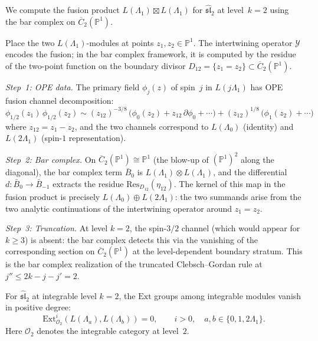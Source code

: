 \begin{example}
\label{ex:fusion-bar-sl2}
We compute the fusion product $L(\Lambda_1) \boxtimes L(\Lambda_1)$
for $\widehat{\mathfrak{sl}}_2$ at level~$k=2$ using the bar
complex on $\overline{C}_2(\mathbb{P}^1)$.

Place the two $L(\Lambda_1)$-modules at points $z_1, z_2 \in
\mathbb{P}^1$. The intertwining operator $\mathcal{Y}$ encodes
the fusion; in the bar complex framework, it is computed by the
residue of the two-point function on the boundary divisor
$D_{12} = \{z_1 = z_2\} \subset \overline{C}_2(\mathbb{P}^1)$.

\emph{Step~1: OPE data.}
The primary field $\phi_j(z)$ of spin~$j$ in $L(j\Lambda_1)$ has
OPE fusion channel decomposition:
\[
\phi_{1/2}(z_1)\, \phi_{1/2}(z_2)
\sim (z_{12})^{-3/8}\, \bigl(
\phi_0(z_2) + z_{12}\, \partial\phi_0
+ \cdots
\bigr)
+ (z_{12})^{1/8}\, \bigl(
\phi_1(z_2) + \cdots
\bigr)
\]
where $z_{12} = z_1 - z_2$, and the two channels correspond
to $L(\Lambda_0)$ (identity) and $L(2\Lambda_1)$ (spin-$1$
representation).

\emph{Step~2: Bar complex.}
On $\overline{C}_2(\mathbb{P}^1) \cong \mathbb{P}^1$
(the blow-up of $(\mathbb{P}^1)^2$ along the diagonal), the
bar complex term $\bar{B}_0$ is
$L(\Lambda_1) \otimes L(\Lambda_1)$, and the differential
$d\colon \bar{B}_0 \to \bar{B}_{-1}$ extracts the residue
$\mathrm{Res}_{D_{12}}(\eta_{12})$. The kernel of this
map in the fusion product is precisely
$L(\Lambda_0) \oplus L(2\Lambda_1)$: the two summands arise
from the two analytic continuations of the intertwining
operator around $z_1 = z_2$.

\emph{Step~3: Truncation.}
At level $k = 2$, the spin-$3/2$ channel
(which would appear for $k \geq 3$) is absent: the bar complex
detects this via the vanishing of the corresponding section on
$\overline{C}_2(\mathbb{P}^1)$ at the level-dependent boundary
stratum. This is the bar complex realization of the truncated
Clebsch--Gordan rule at $j'' \leq 2k - j - j' = 2$.
\end{example}

\begin{proposition}
\label{prop:ext-sl2-level2}
For $\widehat{\mathfrak{sl}}_2$ at integrable level $k = 2$, the
$\mathrm{Ext}$ groups among integrable modules vanish in positive
degree:
\begin{equation}\label{eq:ext-sl2-level2}
\mathrm{Ext}^i_{\mathcal{O}_2}(L(\Lambda_a), L(\Lambda_b)) = 0,
\qquad i > 0,\quad a, b \in \{0, 1, 2\Lambda_1\}.
\end{equation}
Here $\mathcal{O}_2$ denotes the integrable category at level~$2$.
\end{proposition}

